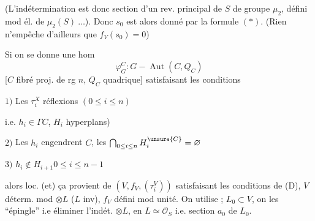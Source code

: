 (L'indétermination est donc section d'un rev. principal de $S$ de groupe $\mu_2$,
défini mod él. de $\mu_2(S)\ \ldots$).
Donc $s_0$ est alors donné par la formule $(*)$.
(Rien n'empêche d'ailleurs que $f_V(s_0)=0$)

Si on se donne une hom
\[
\varphi_G^C:G\mathbin{-}\operatorname{Aut}(C,Q_C)
\]
[$C$ fibré proj. de rg $n$, $Q_C$ quadrique]
satisfaisant les conditions

$1)$ Les $\tau_i^X$ réflexions 
\hfill$(0\leq i\leq n)$

\hfill i.e. $h_i\in\Gamma C$, $H_i$ hyperplans)

$2)$ Les $h_i$ engendrent $C$, les
$\bigcap_{0\leq i\leq n}H_i^{\unsure{C}}=\varnothing$

$3)$ 
\quad$h_i\notin H_{i+1}$\hfill$0\leq i\leq n-1$


\margin{(Si $n=1$, une réflexion de $C$ donne \unsure{pour}
$C=P(W)$, \unsure{ne remonte pas} de \uline{façon unique}
en \unsure{réfl.} de $V\ldots$]}

alors loc. (et) ça provient de
$(V,f_V,(\tau_i^V))$ satisfaisant les conditions de (D),
$V$ déterm. mod $\otimes L$ ($L$ inv),
$f_V$ défini mod unité.
On utilise ;
$L_0\subset V$, on les ``épingle'' i.e éliminer l'indét. $\otimes L$,
en  $L\simeq\mathcal O_S$
i.e. section $a_0$ de $L_0$.


